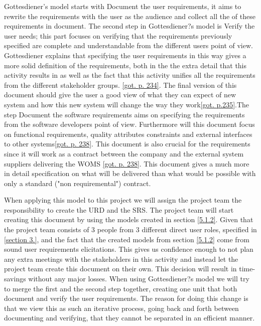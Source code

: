 \documentclass[a4paper]{article}
\begin{document}
Gottesdiener's model starts with Document the user requirements, it aims to rewrite the requirements with the user as the audience and collect all the of these requirements in document. The second step in Gottesdiener?s model is Verify the user needs; this part focuses on verifying that the requirements previously specified are complete and understandable from the different users point of view. Gottesdiener explains that specifying the user requirements in this way gives a more solid definition of the requirements, both in the the extra detail that this activity results in as well as the fact that this activity unifies all the requirements from the different stakeholder groups. \ref{got. p. 234}. The final version of this document should give the user a good view of what they can expect of new system and how this new system will change the way they work\ref{got. p.235}.The step Document the software requirements aims on specifying the requirements from the software developers point of view. Furthermore will this document focus on functional requirements, quality attributes constraints and external interfaces to other systems\ref{got. p. 238}. This document is also crucial for the requirements since it will work as a contract between the company and the external system suppliers delivering the WOMS \ref{got. p. 238}. This document gives a much more in detail specification on what will be delivered than what would be possible with only a standard ("non requiremental") contract. 

When applying this model to this project we will assign the project team the responsibility to create the URD and the SRS. The project team will start creating this document by using the models created in section \ref{5.1.2}.  Given that the project team consists of 3 people from 3 different direct user roles, specified in \ref{section 3.}, and the fact that the created models from section \ref{5.1.2} come from sound user requirements elicitations. This gives us confidence enough to not plan any extra meetings with the stakeholders in this activity and instead let the project team create this document on their own. This decision will result in time-savings without any major losses. When using Gottesdiener?s model we will try to merge the first and the second step together, creating one unit that both document and verify the user requirements. The reason for doing this change is that we view this as such an iterative process, going back and forth between documenting and verifying, that they cannot be separated in an efficient manner.  
\end{document}
